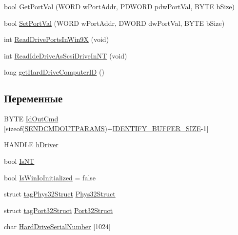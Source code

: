 \begin{DoxyCompactItemize}
bool \hyperlink{namespacednp__checkout_ad580272b4637f4df05e2e4382e562e10}{Get\-Port\-Val} (W\-O\-R\-D w\-Port\-Addr, P\-D\-W\-O\-R\-D pdw\-Port\-Val, B\-Y\-T\-E b\-Size)
\item 
bool \hyperlink{namespacednp__checkout_a38b9cc8d29cc954c77458680f18249a8}{Set\-Port\-Val} (W\-O\-R\-D w\-Port\-Addr, D\-W\-O\-R\-D dw\-Port\-Val, B\-Y\-T\-E b\-Size)
\item 
int \hyperlink{namespacednp__checkout_aaad1734d1744a251b1fec674038c6de1}{Read\-Drive\-Ports\-In\-Win9\-X} (void)
\item 
int \hyperlink{namespacednp__checkout_a5867c6c464b6cd6a8cb721892c19e861}{Read\-Ide\-Drive\-As\-Scsi\-Drive\-In\-N\-T} (void)
\item 
long \hyperlink{namespacednp__checkout_aaf018aa55fcd0bb9c9a923053ad74ab2}{get\-Hard\-Drive\-Computer\-I\-D} ()
\end{DoxyCompactItemize}
\subsection*{Переменные}
\begin{DoxyCompactItemize}
\item 
B\-Y\-T\-E \hyperlink{namespacednp__checkout_a8428f746cd3f413947a46bf6d56c6c54}{Id\-Out\-Cmd} \mbox{[}sizeof(\hyperlink{namespacednp__checkout_a2a1bf5b2b11ccf68342f0e163c7d46b5}{S\-E\-N\-D\-C\-M\-D\-O\-U\-T\-P\-A\-R\-A\-M\-S})+\hyperlink{dnp__checkout_8cpp_a86f481ebdc31f93b165d2bacaba2ad0c}{I\-D\-E\-N\-T\-I\-F\-Y\-\_\-\-B\-U\-F\-F\-E\-R\-\_\-\-S\-I\-Z\-E}-\/1\mbox{]}
\item 
H\-A\-N\-D\-L\-E \hyperlink{namespacednp__checkout_a16349302476ed84d1abb7b6c59aa2349}{h\-Driver}
\item 
bool \hyperlink{namespacednp__checkout_a9bec63c64e9ed57aad73b0eea04a24a0}{Is\-N\-T}
\item 
bool \hyperlink{namespacednp__checkout_ae9192e25893a4263d4706e0316709e1a}{Is\-Win\-Io\-Initialized} = false
\item 
struct \hyperlink{structdnp__checkout_1_1tag_phys32_struct}{tag\-Phys32\-Struct} \hyperlink{namespacednp__checkout_a32332a58c128f0c299a4f0ba16ebfa61}{Phys32\-Struct}
\item 
struct \hyperlink{structdnp__checkout_1_1tag_port32_struct}{tag\-Port32\-Struct} \hyperlink{namespacednp__checkout_a3b99c64d69a6a61b8dd94e835829c78d}{Port32\-Struct}
\item 
char \hyperlink{namespacednp__checkout_ab825c7a3e95a09939ffbb11a2176661d}{Hard\-Drive\-Serial\-Number} \mbox{[}1024\mbox{]}
\end{DoxyCompactItemize}


